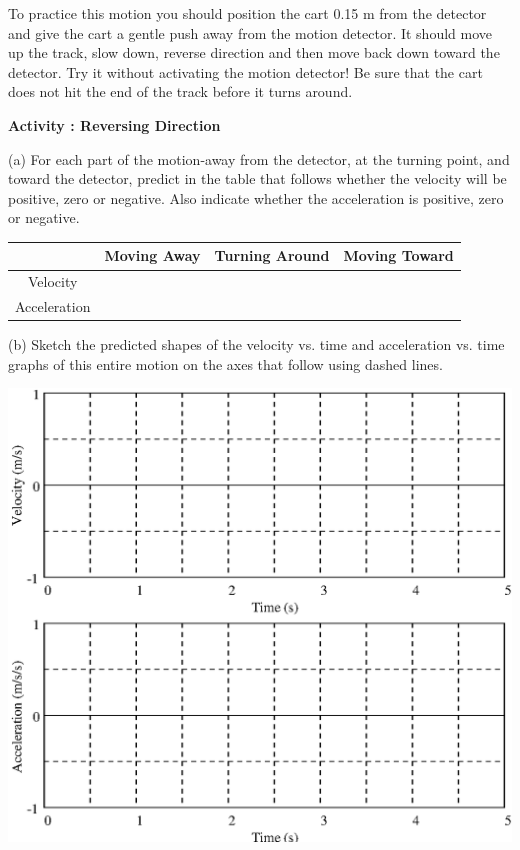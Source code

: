 To practice this motion you should position the cart 0.15 m from the detector
and give the cart a gentle push away from the motion detector. It should move
up the track, slow down, reverse direction and then move back down toward the
detector. Try it without activating the motion detector! Be sure that the cart
does not hit the end of the track before it turns around. 

\textbf{Activity : Reversing Direction }

(a) For each part of the motion-away from the detector, at the turning point,
and toward the detector, predict in the table that follows whether the velocity
will be positive, zero or negative. Also indicate whether the acceleration is
positive, zero or negative.

\vspace{0.3cm}
{\centering \begin{tabular}{|c|c|c|c|}
\hline 
&
Moving Away&
Turning Around&
Moving Toward\\
\hline 
Velocity&
&
&
\\
\hline 
Acceleration&
&
&
\\
\hline 
\end{tabular}\par}
\vspace{0.3cm}

(b) Sketch the predicted shapes of the velocity vs. time and acceleration vs.
time graphs of this entire motion on the axes that follow using dashed lines.

\vspace{0.3cm}
{\par\centering \includegraphics{slowing/slowing_fig5.eps} \par}
\vspace{13mm}

